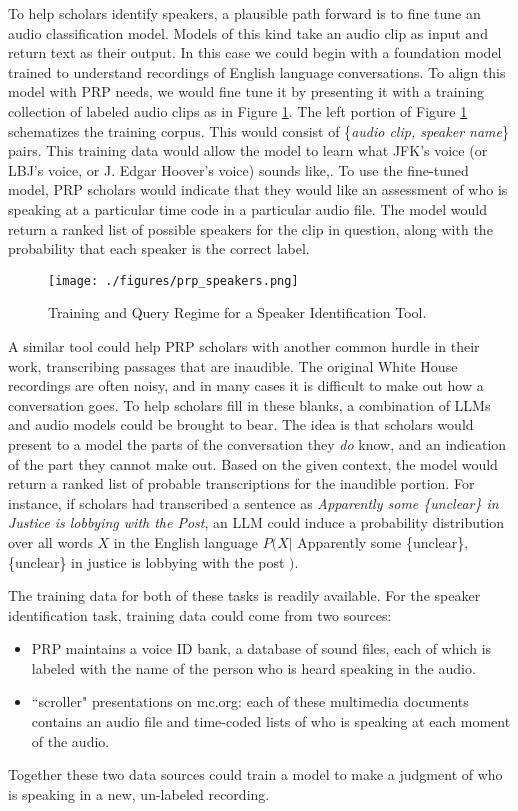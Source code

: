 \documentclass[12pt, oneside]{article}   	%
\begin{document}
To help scholars identify speakers, a plausible path forward is to fine tune an audio classification model.  Models of this kind take an audio clip as input and return text as their output.  In this case we could begin with a foundation model trained to understand recordings of English language conversations.  To align this model with PRP needs, we would fine tune it by presenting it with a training collection of labeled audio clips as in Figure \ref{figure.prpspeakers}.  The left portion of Figure \ref{figure.prpspeakers} schematizes the training corpus.  This would consist of \{\emph{audio clip, speaker name}\} pairs.  This training data would allow the model to learn what JFK's voice (or LBJ's voice, or J. Edgar Hoover's voice) sounds like,.  To use the fine-tuned model, PRP scholars would indicate that they would like an assessment of who is speaking at a particular time code in a particular audio file.  The model would return a ranked list of possible speakers for the clip in question, along with the probability that each speaker is the correct label.  

\begin{figure}[htbp]
\begin{center}
\texttt{[image: ./figures/prp\_speakers.png]}
\caption{Training and Query Regime for a Speaker Identification Tool.}
\label{figure.prpspeakers}
\end{center}
\end{figure}

A similar tool could help PRP scholars with another common hurdle in their work, transcribing passages that are inaudible.  The original White House recordings are often noisy, and in many cases it is difficult  to make out how a conversation goes.  To help scholars fill in these blanks, a combination of LLMs and audio models could be brought to bear.  The idea is that scholars would present to a model the parts of the conversation they \emph{do} know, and an indication of the part they cannot make out.  Based on the given context, the model would return a ranked list of probable transcriptions for the inaudible portion.  For instance, if scholars had transcribed a sentence as \emph{Apparently some \{unclear\} in Justice is lobbying with the Post}, an LLM could induce a probability distribution over all words $X$ in the English language $P(X | $ Apparently some \{unclear\}, \{unclear\} in justice is lobbying with the post $)$.

The training data for both of these tasks is readily available.  For the speaker identification task, training data could come from two sources:
\begin{itemize}
\item PRP maintains a voice ID bank, a database of sound files, each of which is labeled with the name of the person who is heard speaking in the audio.
\item ``scroller" presentations on mc.org: each of these multimedia documents contains an audio file and time-coded lists of who is speaking at each moment of the audio.
\end{itemize}
Together these two data sources could train a model to make a judgment of who is speaking in a new, un-labeled recording.
\end{document}
